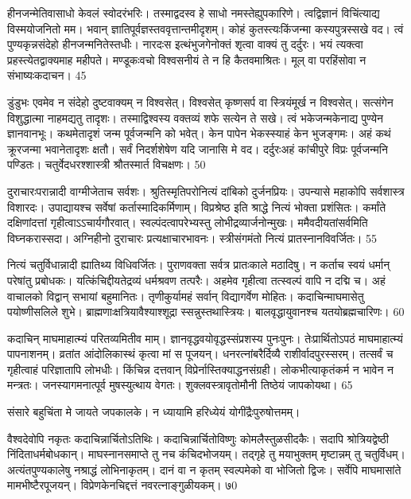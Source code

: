   हीनजन्मेतिवासाधो केवलं स्वोदरंभरिः।
 तस्माद्वदस्व हे साधो नमस्तेह्युपकारिणे।
 त्वद्विज्ञानं विचिंत्याद्य विस्मयोजनितो मम।
 भवान् ज्ञातिपूर्वज्ञस्तववृत्तान्तमीदृशम्।
 कोहं कुतस्त्यःकिंजन्मा कस्यपुत्रस्सखे वद।
 त्वं पुण्यकृन्नसंदेहो हीनजन्मनितेस्तधीः।
 नारदःस इत्थंभुजगेनोक्तं शृत्वा वाक्यं तु दर्दुरः।
 भयं त्यक्त्वा प्रहस्त्येतद्वाक्यमाह महीपते।
 मण्डूकःवचो विश्वसनीयं ते न हि कैतवमाश्रितः।
 मूल् वा परहिंसोवा न संभाष्यःकदाचन।
 45

  डुंडुभः
एवमेव न संदेहो दुष्टवाक्यम् न विश्वसेत्।
 विश्वसेत् कृष्णसर्प वा स्त्रियंमूर्ख न विश्वसेत्।
 सत्संगेन विशुद्धात्मा नाहमद्यतु तादृशः।
 तस्माद्विश्वस्य वक्तव्यं शफे सत्येन ते सखे।
 त्वं भकेजन्मकेनाद्य पुण्येन ज्ञानवानभूः।
 कथमेतादृशं जन्म पूर्वजन्मनि को भवेत्।
 केन पापेन भेकस्स्याहं केन भुजङ्गमः।
 अहं कथं क्रूरजन्मा भवानेतादृशः क्षतौ।
 सर्वं निदर्शशेषेण यदि जानासि मे वद।
 दर्दुरःअहं कांचीपुरे विप्रः पूर्वजन्मनि पण्डितः।
 चतुर्वेदधरश्शास्त्री श्रौतस्मार्त विचक्षणः।
 50

  दुराचारःपरान्नादी वाग्मीजेताच सर्वशः।
 श्रुतिस्मृतिपरोनित्यं दांबिको दुर्जनप्रियः।
 उपन्यासे महाकोपि सर्वशास्त्र विशारदः।
 उपाद्यायश्च सर्वेषां कर्तास्मादिकर्मिणाम्।
 विप्रश्रेष्ठ इति श्राद्धे नित्यं भोक्ता प्रशंसितः।
 कर्मांते दक्षिणांदत्तां गृहीत्वाऽऽचार्यगौरवात्।
 स्वल्पंदत्वापरेभ्यस्तु लोभीद्रव्यार्जनोन्मुखः।
 ममैवदीयतांसर्वमिति विघ्नकरास्सदा।
 अग्निहीनो दुराचारः प्रत्यक्षाचारभावनः।
 स्त्रीसंगमंतो नित्यं प्रातस्नानविवर्जितः।
 55

 
नित्यं चतुर्विधान्नादी ह्यातिथ्य विधिवर्जितः।
 पुराणवक्ता सर्वत्र प्रातःकाले मठादिषु।
 न कर्ताच स्वयं धर्मान् परेषांतु प्रबोधकः।
 यत्किंचिद्दीयतेद्रव्यं धर्मश्रवण तत्परैः।
 अहमेव गृहीत्वा तत्स्वल्पं वापि न दद्मि च।
 अहं वाचालको विद्वान् सभायां बहुमानितः।
 तृणीकुर्यामहं सर्वान् विद्यागर्वेण मोहितः।
 कदाचिन्माघमासेतु पयोष्णीसलिले शुभे।
 ब्राह्मणाःक्षत्रियावैश्याश्शूद्रा स्सन्नुस्तथास्त्रियः।
 बालवृद्धायुवानश्च यतयोब्रह्मचारिणः।
 60

  कदाचिन् माघमाहात्म्यं परितव्यमितीव माम्।
 ज्ञानवृद्धवयोवृद्धस्संप्रशस्य पुनःपुनः।
 तेःप्रार्थितोऽपठं माघमाहात्म्यं पापनाशनम्।
 व्रतांत आंदोलिकास्थं कृत्वा मां स पूजयन्।
 धनरत्नांबरैर्दिव्यै राशीर्वादपुरस्सरम्।
 तत्सर्वं च गृहीत्वाहं परिज्ञातापि लोभधीः।
 किंचिन्न दत्तवान् विप्रेर्नास्तिक्याद्धनसंग्रही।
 लोकभीत्याकृतंकर्म न भावेन न मन्त्रतः।
 जनस्यागमनात्पूर्व मुषस्युत्थाय वेगतः।
 शुक्लवस्त्रावृतोमौनी तिष्ठेयं जापकोयथा।
 65

  संसारे बहुचिंता मे जायते जपकालके।
 न ध्यायामि हरिध्येयं योगींद्रैःपुरुषोत्तमम्।
 
वैश्वदेवोपि नकृतः कदाचिन्नार्चितोऽतिथिः।
 कदाचिन्नार्चितोविष्णुः कोमलैस्तुळसीदकैः।
 सदापि श्रोत्रियद्वेष्ठी निंदिताधर्मबोधकान्।
 माघस्नानसमाप्ते तु नच कंचिदभोजयम्।
 तद्गृहे तु मयाभुक्तम् मृष्टान्नम् तु चतुर्विधम्।
 अत्यंतपुण्यकालेषु नश्राद्धं लोभिनाकृतम्।
 दानं वा न कृतम् स्वल्पमेको वा भोजितो द्विजः।
 सर्वेपि माघमासांते मामभीष्टैरपूजयन्।
 विप्रेणकेनचिद्दत्तं नवरत्नाङ्गुळीयकम्।
 ७0


